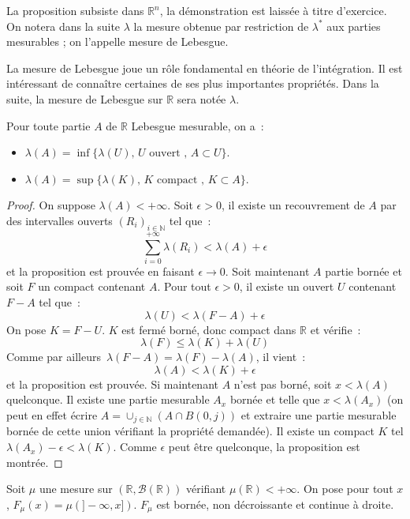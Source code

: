La proposition subsiste dans $\mathbb{R}^n$, la démonstration est
laissée à titre d'exercice. On notera dans la suite $\lambda$ la mesure obtenue
par restriction de $\lambda^*$ aux parties mesurables ; on l'appelle mesure de
Lebesgue.

La mesure de Lebesgue joue un rôle fondamental en théorie de
l'intégration. Il est intéressant de connaître certaines de ses plus
importantes propriétés. Dans la suite, la mesure de Lebesgue sur
$\mathbb{R}$ sera notée $\lambda$.
\begin{mandatory}
\begin{prop}
Pour toute partie $A$ de $\mathbb{R}$ Lebesgue mesurable, on a~:
\begin{itemize}
\item $\lambda(A) = \inf \{ \lambda(U), \, U \mbox{ ouvert } , \, A
  \subset U \}$.
\item $\lambda(A) = \sup \{ \lambda(K), \, K \mbox{ compact } , \, K
  \subset A \}$.
\end{itemize}
\end{prop}
\end{mandatory}
\begin{proof}
On suppose $\lambda(A) < +\infty$. Soit $\epsilon > 0$, il existe un
recouvrement de $A$ par des intervalles ouverts $(R_i)_{i \in \mathbb{N}}$  tel que~:
\[
\sum_{i=0}^{+\infty} \lambda(R_i) < \lambda(A) + \epsilon
\]
et la proposition est prouvée en faisant $\epsilon \to 0$.
Soit maintenant $A$ partie bornée et soit $F$ un compact contenant $A$. 
Pour tout $\epsilon>0$, il existe un ouvert $U$ contenant $F-A$ tel que~:
\[
\lambda(U) < \lambda(F-A) + \epsilon
\]
On pose $K=F-U$. $K$ est fermé borné, donc compact dans $\mathbb{R}$
et vérifie~:
\[
\lambda(F) \leq \lambda(K) + \lambda(U)
\]
Comme par ailleurs~$\lambda(F-A) = \lambda(F) - \lambda(A)$, il vient~:
\[
\lambda(A) < \lambda(K) + \epsilon
\]
et la proposition est prouvée.
Si maintenant $A$ n'est pas borné, soit $x<\lambda(A)$ quelconque. Il
existe une partie mesurable $A_x$ bornée et telle que $x <
\lambda(A_x)$ (on peut en effet écrire $A =  \cup_{j \in \mathbb{N}}
\left ( A \cap
B(0,j) \right )$ et extraire une partie mesurable bornée de cette union
vérifiant la propriété demandée).
Il existe un compact $K$ tel $\lambda(A_x) - \epsilon <
\lambda(K)$. Comme $\epsilon$ peut être quelconque, la proposition est
montrée.
\end{proof}
\begin{prop}
Soit $\mu$ une mesure sur $(\mathbb{R}, \mathcal{B}(\mathbb{R}))$
vérifiant $\mu(\mathbb{R}) < +\infty$. On pose pour tout $x$,
$F_\mu(x) = \mu(]-\infty, x])$. $F_\mu$ est bornée, non décroissante
et continue à droite.
\end{prop}
